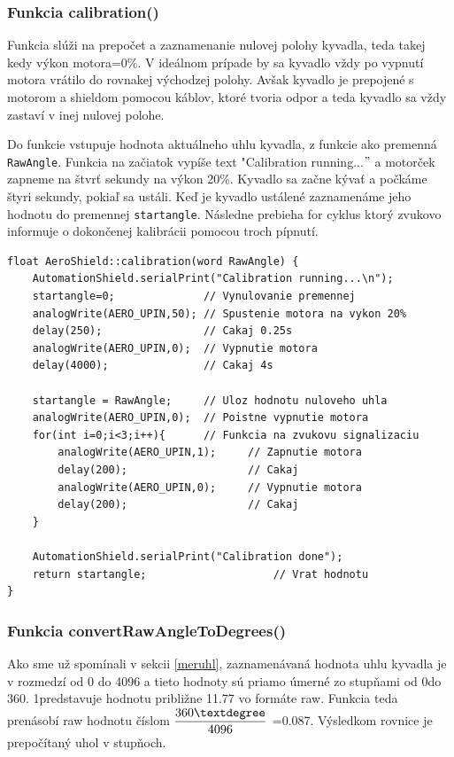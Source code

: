 \subsubsection{Funkcia calibration()}

Funkcia  slúži na prepočet a zaznamenanie nulovej polohy kyvadla, teda takej kedy výkon motora=0\%. V ideálnom prípade by sa kyvadlo vždy po vypnutí motora vrátilo do rovnakej východzej polohy. Avšak kyvadlo je prepojené s motorom a shieldom pomocou káblov, ktoré tvoria odpor a teda kyvadlo sa vždy zastaví v inej nulovej polohe. 

Do funkcie vstupuje hodnota aktuálneho uhlu kyvadla, z funkcie  ako premenná \verb|RawAngle|. Funkcia na začiatok vypíše text "Calibration running...$"$ a motorček zapneme na štvrť sekundy na výkon 20\%. Kyvadlo sa začne kývať a počkáme štyri sekundy, pokiaľ sa ustáli. Keď je kyvadlo ustálené zaznamenáme jeho hodnotu do premennej \verb|startangle|. Následne prebieha for cyklus ktorý zvukovo informuje o dokončenej kalibrácii pomocou troch pípnutí. 

\begin{lstlisting}[caption={Zdrojový kód funkcie calibration.},captionpos=b]
float AeroShield::calibration(word RawAngle) {  
	AutomationShield.serialPrint("Calibration running...\n");  
	startangle=0;              // Vynulovanie premennej 
	analogWrite(AERO_UPIN,50); // Spustenie motora na vykon 20%
	delay(250);                // Cakaj 0.25s 
	analogWrite(AERO_UPIN,0);  // Vypnutie motora
	delay(4000);               // Cakaj 4s
	
	startangle = RawAngle;     // Uloz hodnotu nuloveho uhla
	analogWrite(AERO_UPIN,0);  // Poistne vypnutie motora 
	for(int i=0;i<3;i++){      // Funkcia na zvukovu signalizaciu
		analogWrite(AERO_UPIN,1);     // Zapnutie motora
		delay(200);                   // Cakaj
		analogWrite(AERO_UPIN,0);     // Vypnutie motora
		delay(200);                   // Cakaj
	}
	
	AutomationShield.serialPrint("Calibration done");
	return startangle;                    // Vrat hodnotu 
}
\end{lstlisting}

\subsubsection{Funkcia convertRawAngleToDegrees()}

Ako sme už spomínali v sekcii \ref{meruhl}, zaznamenávaná hodnota uhlu kyvadla je v rozmedzí od 0 do 4096 a tieto hodnoty sú priamo úmerné zo stupňami od 0\textdegree  do 360\textdegree. 1\textdegree   predstavuje hodnotu približne 11.77 vo formáte raw. Funkcia teda prenásobí raw hodnotu číslom  $\dfrac{360\textdegree}{4096}$ =0.087\textdegree. Výsledkom rovnice je prepočítaný uhol v stupňoch. 

